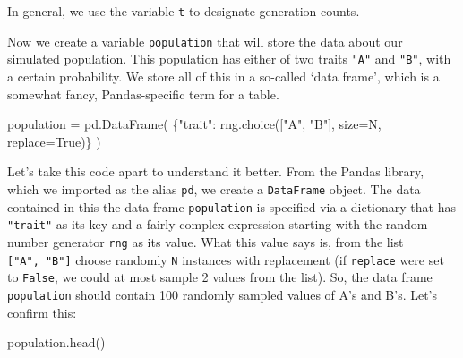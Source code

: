 \documentclass[
  a4paperpaper,
  ,captions=tableheading
]{scrbook}
\newenvironment{Shaded}{\begin{snugshade}}{\end{snugshade}}
\newcommand{\NormalTok}[1]{\textcolor[rgb]{0.00,0.23,0.31}{#1}}
\newcommand{\OperatorTok}[1]{\textcolor[rgb]{0.37,0.37,0.37}{#1}}
\newcommand{\StringTok}[1]{\textcolor[rgb]{0.13,0.47,0.30}{#1}}
\newcommand{\VariableTok}[1]{\textcolor[rgb]{0.07,0.07,0.07}{#1}}
\begin{document}
\begin{tcolorbox}[enhanced jigsaw, arc=.35mm, colbacktitle=quarto-callout-note-color!10!white, colback=white, breakable, toprule=.15mm, title=\textcolor{quarto-callout-note-color}{\faInfo}\hspace{0.5em}{Note}, left=2mm, bottomtitle=1mm, toptitle=1mm, leftrule=.75mm, opacitybacktitle=0.6, titlerule=0mm, opacityback=0, rightrule=.15mm, bottomrule=.15mm, coltitle=black, colframe=quarto-callout-note-color-frame]

In general, we use the variable \texttt{t} to designate generation
counts.

\end{tcolorbox}

Now we create a variable \texttt{population} that will store the data
about our simulated population. This population has either of two traits
\texttt{"A"} and \texttt{"B"}, with a certain probability. We store all
of this in a so-called `data frame', which is a somewhat fancy,
Pandas-specific term for a table.

\begin{Shaded}
\begin{Highlighting}[]
\NormalTok{population }\OperatorTok{=}\NormalTok{ pd.DataFrame(}
\NormalTok{    \{}\StringTok{"trait"}\NormalTok{: rng.choice([}\StringTok{"A"}\NormalTok{, }\StringTok{"B"}\NormalTok{], size}\OperatorTok{=}\NormalTok{N, replace}\OperatorTok{=}\VariableTok{True}\NormalTok{)\}}
\NormalTok{)}
\end{Highlighting}
\end{Shaded}

Let's take this code apart to understand it better. From the Pandas
library, which we imported as the alias \texttt{pd}, we create a
\texttt{DataFrame} object. The data contained in this the data frame
\texttt{population} is specified via a dictionary that has
\texttt{"trait"} as its key and a fairly complex expression starting
with the random number generator \texttt{rng} as its value. What this
value says is, from the list \texttt{{[}"A",\ "B"{]}} choose randomly
\texttt{N} instances with replacement (if \texttt{replace} were set to
\texttt{False}, we could at most sample 2 values from the list). So, the
data frame \texttt{population} should contain 100 randomly sampled
values of A's and B's. Let's confirm this:

\begin{Shaded}
\begin{Highlighting}[]
\NormalTok{population.head()}
\end{Highlighting}
\end{Shaded}
\end{document}
